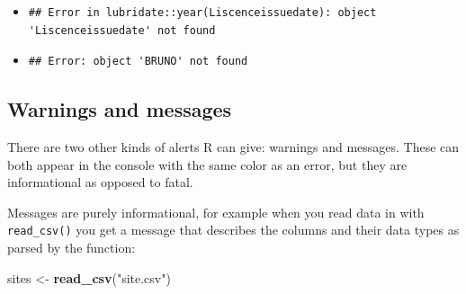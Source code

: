 \documentclass[]{Nemilov}
\newenvironment{Shaded}{\begin{snugshade}}{\end{snugshade}}
\newcommand{\DataTypeTok}[1]{\textcolor[rgb]{0.13,0.29,0.53}{#1}}
\newcommand{\KeywordTok}[1]{\textcolor[rgb]{0.13,0.29,0.53}{\textbf{#1}}}
\newcommand{\NormalTok}[1]{#1}
\newcommand{\OperatorTok}[1]{\textcolor[rgb]{0.81,0.36,0.00}{\textbf{#1}}}
\newcommand{\StringTok}[1]{\textcolor[rgb]{0.31,0.60,0.02}{#1}}
\begin{document}
\begin{itemize}
\item
\begin{Shaded}
\end{Shaded}

\begin{verbatim}
## Error in lubridate::year(Liscenceissuedate): object 'Liscenceissuedate' not found
\end{verbatim}
\item
\begin{Shaded}
\end{Shaded}

\begin{verbatim}
## Error: object 'BRUNO' not found
\end{verbatim}
\end{itemize}

\hypertarget{warnings-and-messages}{%
\subsection{Warnings and messages}\label{warnings-and-messages}}

There are two other kinds of alerts R can give: warnings and messages. These can both appear in the console with the same color as an error, but they are informational as opposed to fatal.

Messages are purely informational, for example when you read data in with \texttt{read\_csv()} you get a message that describes the columns and their data types as parsed by the function:

\begin{Shaded}
\begin{Highlighting}[]
\NormalTok{sites <-}\StringTok{ }\KeywordTok{read_csv}\NormalTok{(}\StringTok{"site.csv"}\NormalTok{)}
\end{Highlighting}
\end{Shaded}
\end{document}
